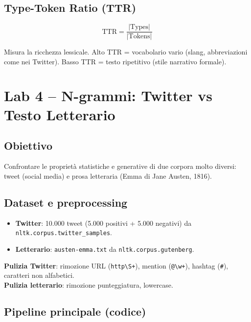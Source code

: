 \documentclass[12pt,a4paper]{article}
\begin{document}
\subsection{Type-Token Ratio (TTR)}

\begin{formulabox}
\[
\text{TTR} = \frac{|\text{Types}|}{|\text{Tokens}|}
\]
\end{formulabox}

Misura la ricchezza lessicale. Alto TTR = vocabolario vario (slang, abbreviazioni come nei Twitter). Basso TTR = testo ripetitivo (stile narrativo formale).

\section{Lab 4 -- N-grammi: Twitter vs Testo Letterario}

\subsection{Obiettivo}

Confrontare le proprietà statistiche e generative di due corpora molto diversi: tweet (social media) e prosa letteraria (Emma di Jane Austen, 1816).

\subsection{Dataset e preprocessing}

\begin{itemize}[leftmargin=1.5em]
  \item \textbf{Twitter}: 10.000 tweet (5.000 positivi + 5.000 negativi) da \texttt{nltk.corpus.twitter\_samples}.
  \item \textbf{Letterario}: \texttt{austen-emma.txt} da \texttt{nltk.corpus.gutenberg}.
\end{itemize}

\textbf{Pulizia Twitter}: rimozione URL (\verb|http\S+|), mention (\verb|@\w+|), hashtag (\verb|#|), caratteri non alfabetici.\\
\textbf{Pulizia letterario}: rimozione punteggiatura, lowercase.

\subsection{Pipeline principale (codice)}
\end{document}
